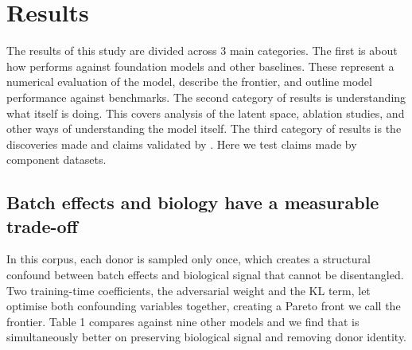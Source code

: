 %
%
%

\section*{Results}

The results of this study are divided across 3 main categories. The first is 
about how \elaj performs against foundation models and other baselines. These 
represent a numerical evaluation of the model, describe the frontier, and 
outline model performance against benchmarks. The second category of results is 
understanding what \elaj itself is doing. This covers analysis of the \elaj 
latent space, ablation studies, and other ways of understanding the model itself.
The third category of results is the discoveries made and claims validated 
by \elaj. Here we test claims made by component datasets.

\subsection*{Batch effects and biology have a measurable trade-off}

In this corpus, each donor is sampled only once, which creates a structural 
confound between batch effects and biological signal that cannot be 
disentangled. Two training-time coefficients, the adversarial weight and the 
KL term, let \elaj{} optimise both confounding variables together, creating a 
Pareto front we call the \elaj{} frontier. Table 1 compares \elaj against 
nine other models and we find that \elaj is simultaneously better on 
preserving biological signal and removing donor identity.

